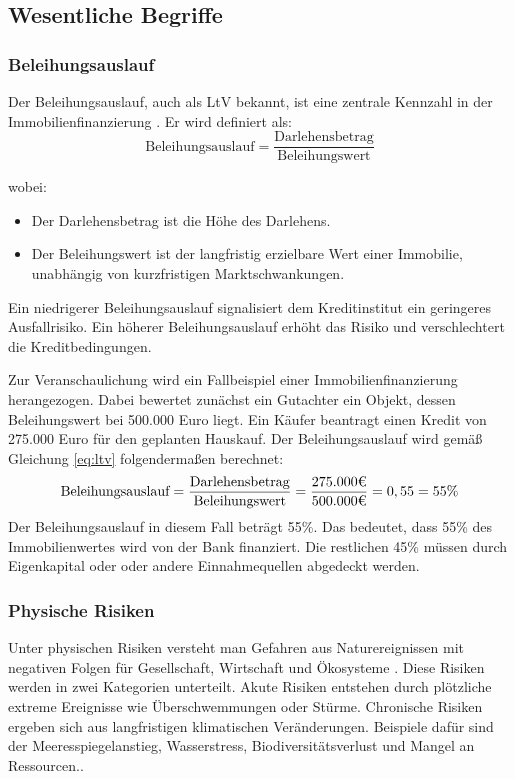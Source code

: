 \subsection{Wesentliche Begriffe}
\subsubsection{Beleihungsauslauf}
Der Beleihungsauslauf, auch als \ac{LtV} bekannt, ist eine zentrale Kennzahl in der Immobilienfinanzierung \parencite{BelWertV_3}. Er wird definiert als:
\begin{equation}
    \text{Beleihungsauslauf} = \frac{\text{Darlehensbetrag}}{\text{Beleihungswert}}
    \label{eq:ltv}
\end{equation}

\noindent wobei:
\begin{itemize}
    \item Der Darlehensbetrag ist die Höhe des Darlehens.
    \item Der Beleihungswert ist der langfristig erzielbare Wert einer Immobilie, unabhängig von kurzfristigen Marktschwankungen.
\end{itemize}

Ein niedrigerer Beleihungsauslauf signalisiert dem Kreditinstitut ein geringeres Ausfallrisiko. Ein höherer Beleihungsauslauf erhöht das Risiko und verschlechtert die Kreditbedingungen.

Zur Veranschaulichung wird ein Fallbeispiel einer Immobilienfinanzierung herangezogen. Dabei bewertet zunächst ein Gutachter ein Objekt, dessen Beleihungswert bei 500.000 Euro liegt. Ein Käufer beantragt einen Kredit von 275.000 Euro für den geplanten Hauskauf.
Der Beleihungsauslauf wird gemäß Gleichung \ref{eq:ltv} folgendermaßen berechnet:
\begin{equation}
    \text{Beleihungsauslauf} = \frac{\text{Darlehensbetrag}}{\text{Beleihungswert}} = \frac{275.000 \mbox{\texteuro}}{500.000 \mbox{\texteuro}} = 0,55 = 55\%
\end{equation}
Der Beleihungsauslauf in diesem Fall beträgt 55\%. Das bedeutet, dass 55\% des Immobilienwertes wird von der Bank finanziert. Die restlichen 45\% müssen durch Eigenkapital oder oder andere Einnahmequellen abgedeckt werden.
\subsubsection{Physische Risiken}
Unter physischen Risiken versteht man Gefahren aus Naturereignissen mit negativen Folgen für Gesellschaft, Wirtschaft und Ökosysteme \parencite{greenvisionsolutions_transitorische_2024}. Diese Risiken werden in zwei Kategorien unterteilt. Akute Risiken entstehen durch plötzliche extreme Ereignisse wie Überschwemmungen oder Stürme. Chronische Risiken ergeben sich aus langfristigen klimatischen Veränderungen. Beispiele dafür sind der Meeresspiegelanstieg, Wasserstress, Biodiversitätsverlust und Mangel an Ressourcen.\parencite{dnb2019values}.
